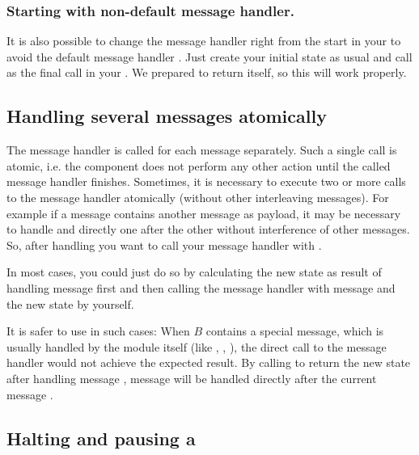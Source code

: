 \subsubsection{Starting with non-default message handler.}
It is also possible to change the message handler right from the start
in your  to avoid the default message
handler . Just create your initial
state as usual and call  as the final call in your
. We prepared
 to return  itself,
so this will work properly.

\subsection{Handling several messages atomically}

The message handler is called for each message separately. Such a single
call is atomic, i.e. the component does not perform any other action until
the called message handler finishes. Sometimes, it is necessary to execute
two or more calls to the message handler atomically (without other
interleaving messages). For example if a message  contains another
message  as payload, it may be necessary to handle  and
 directly one after the other without interference of other
messages. So, after handling  you want to call your message handler
with .

In most cases, you could just do so by calculating the new state as result
of handling message  first and then calling the message handler with
message  and the new state by yourself.

It is safer to use  in such cases: When
$B$ contains a special message, which is usually handled by the
 module itself (like
, , ), the direct call
to the message handler would not achieve the expected result. By calling
 to return the new state after
handling message , message  will be handled directly after
the current message .

\subsection{\texorpdfstring{Halting and pausing a }
{Halting and pausing a gen\_component}}

